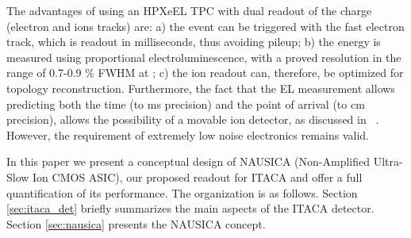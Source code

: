 \documentclass[11pt,a4paper]{article}
\begin{document}
The advantages of using an HPXeEL TPC with dual readout of the charge (electron and ions tracks) are: a) the event can be triggered with the fast electron track, which is readout in milliseconds, thus avoiding pileup; b) the energy is measured using proportional electroluminescence, with a proved resolution in the range of 0.7-0.9 \% FWHM at \Qbb; c) the ion readout can, therefore, be optimized for topology reconstruction. Furthermore, the fact that the EL measurement allows predicting both the time (to ms precision) and the point of arrival (to cm precision), allows the possibility of a movable ion detector, as discussed in ~\cite{itaca2026}. However, the requirement of extremely low noise electronics remains valid. 



In this paper we present a conceptual design of NAUSICA (Non-Amplified Ultra-Slow Ion CMOS ASIC), our proposed readout for ITACA and offer a full quantification of its performance. 
%
The organization is as follows. Section \ref{sec:itaca_det} briefly summarizes the main aspects of the ITACA detector. 
Section \ref{sec:nausica} presents the NAUSICA concept.
\end{document}
